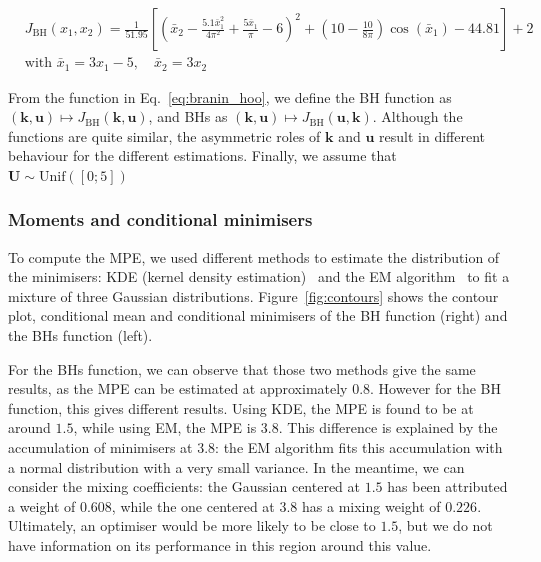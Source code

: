 \documentclass[npg, manuscript]{copernicus}
\begin{document}
\begin{align}
  \label{eq:branin_hoo}
 & J_{\mathrm{BH}}(x_1,x_2) = \frac{1}{51.95}\left[\left(\bar{x}_2 - \frac{5.1 \bar{x}_1^2}{4\pi^2} + \frac{5\bar{x}_1}{\pi} -6 \right)^2 + \left(10 - \frac{10}{8\pi}\right)\cos(\bar{x}_1)-44.81\right]+2\\
&  \text{with } \bar{x}_1 = 3x_1-5,\quad \bar{x}_2 = 3x_2
\end{align}

From the function in Eq.~\eqref{eq:branin_hoo}, we define the BH function as $(\mathbf{k},\mathbf{u}) \mapsto J_{\mathrm{BH}}(\mathbf{k},\mathbf{u})$, and BHs as $(\mathbf{k},\mathbf{u}) \mapsto J_{\mathrm{BH}}(\mathbf{u},\mathbf{k})$. Although the functions are quite similar, the asymmetric roles of $\mathbf{k}$ and $\mathbf{u}$  result in different behaviour for the different estimations.
Finally, we assume that $\mathbf{U}\sim \mathrm{Unif}([0;5])$
\subsubsection{Moments and conditional minimisers}

To compute the MPE, we used different methods to estimate the distribution of the minimisers: KDE (kernel density estimation)~\citep{parzen_estimation_1962,bishop_pattern_2006} and the EM algorithm~\citep{dempster_maximum_1977,borman_expectation_2004} to fit a mixture of three Gaussian distributions. Figure~\ref{fig:contours} shows the contour plot, conditional mean and conditional minimisers of the BH function (right) and the BHs function (left).

For the BHs function, we can observe that those two methods give the same results, as the MPE can be estimated at approximately $0.8$. However for the BH function, this gives different results. Using KDE, the MPE is found to be at around $1.5$, while using EM, the MPE is $3.8$. This difference is explained by the accumulation of minimisers at $3.8$: the EM algorithm fits this accumulation with a normal distribution with a very small variance. In the meantime, we can consider the mixing coefficients: the Gaussian centered at $1.5$ has been attributed a weight of $0.608$, while the one centered at $3.8$ has a mixing weight of $0.226$. Ultimately, an optimiser would be more likely to be close to $1.5$, but we do not have information on its performance in this region around this value.
\end{document}
